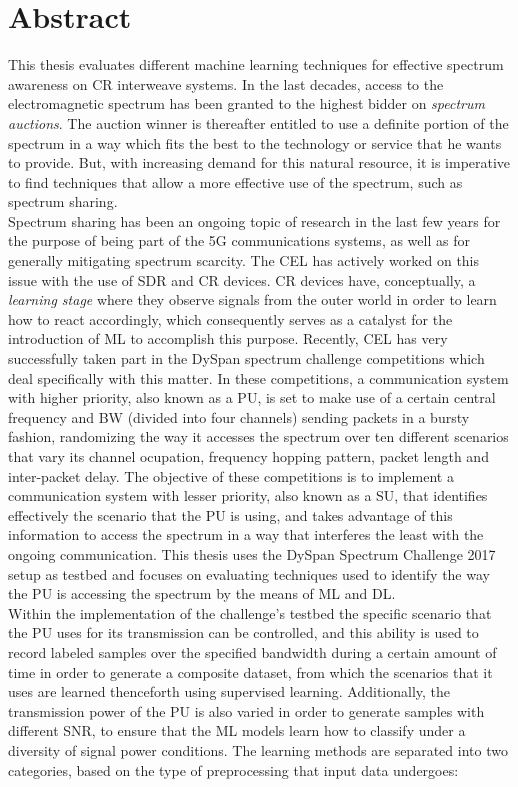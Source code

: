 \chapter*{Abstract}

This thesis evaluates different machine learning techniques for effective spectrum awareness on \ac{CR} interweave systems. In the last decades, access to the electromagnetic spectrum has been granted to the highest bidder on \emph{spectrum auctions}. The auction winner is thereafter entitled to use a definite portion of the spectrum in a way which fits the best to the technology or service that he wants to provide. But, with increasing demand for this natural resource, it is imperative to find techniques that allow a more effective use of the spectrum, such as spectrum sharing.\\

Spectrum sharing has been an ongoing topic of research in the last few years for the purpose of being part of the 5G communications systems, as well as for generally mitigating spectrum scarcity. The \ac{CEL} has actively worked on this issue with the use of \ac{SDR} and \ac{CR} devices. \ac{CR} devices have, conceptually, a \emph{learning stage} where they observe signals from the outer world in order to learn how to react accordingly, which consequently serves as a catalyst for the introduction of \ac{ML} to accomplish this purpose. Recently, \ac{CEL} has very successfully taken part in the \ac{DySpan} spectrum challenge competitions which deal specifically with this matter. In these competitions, a communication system with higher priority, also known as a \ac{PU}, is set to make use of a certain central frequency and \ac{BW} (divided into four channels) sending packets in a bursty fashion, randomizing the way it accesses the spectrum over ten different scenarios that vary its channel ocupation, frequency hopping pattern, packet length and inter-packet delay. The objective of these competitions is to implement a communication system with lesser priority, also known as a \ac{SU}, that identifies effectively the scenario that the \ac{PU} is using, and takes advantage of this information to access the spectrum in a way that interferes the least with the ongoing communication. This thesis uses the DySpan Spectrum Challenge 2017 setup as testbed and focuses on evaluating techniques used to identify the way the \ac{PU} is accessing the spectrum by the means of \ac{ML} and \ac{DL}.\\

Within the implementation of the challenge's testbed the specific scenario that the \ac{PU} uses for its transmission can be controlled, and this ability is used to record labeled samples over the specified bandwidth during a certain amount of time in order to generate a composite dataset, from which the scenarios that it uses are learned thenceforth using supervised learning. Additionally, the transmission power of the \ac{PU} is also varied in order to generate samples with different \ac{SNR}, to ensure that the \ac{ML} models learn how to classify under a diversity of signal power conditions. The learning methods are separated into two categories, based on the type of preprocessing that input data undergoes:

